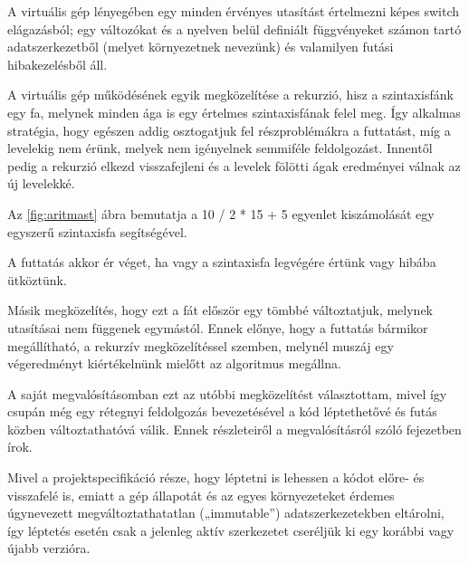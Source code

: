 A virtuális gép lényegében egy minden érvényes utasítást értelmezni képes switch elágazásból; egy változókat és a nyelven belül definiált függvényeket számon tartó adatszerkezetből (melyet környezetnek nevezünk) és valamilyen futási hibakezelésből áll.

A virtuális gép működésének egyik megközelítése a rekurzió, hisz a szintaxisfánk egy fa, melynek minden ága is egy értelmes szintaxisfának felel meg. Így alkalmas stratégia, hogy egészen addig osztogatjuk fel részproblémákra a futtatást, míg a levelekig nem érünk, melyek nem igényelnek semmiféle feldolgozást. Innentől pedig a rekurzió elkezd visszafejleni és a levelek fölötti ágak eredményei válnak az új levelekké.

Az \ref{fig:aritmast} ábra bemutatja a 10 / 2 * 15 + 5 egyenlet kiszámolását egy egyszerű szintaxisfa segítségével.


A futtatás akkor ér véget, ha vagy a szintaxisfa legvégére értünk vagy hibába ütköztünk. 

Másik megközelítés, hogy ezt a fát először egy tömbbé változtatjuk, melynek utasításai nem függenek egymástól. Ennek előnye, hogy a futtatás bármikor megállítható, a rekurzív megközelítéssel szemben, melynél muszáj egy végeredményt kiértékelnünk mielőtt az algoritmus megállna. 

A saját megvalósításomban ezt az utóbbi megközelítést választottam, mivel így csupán még egy rétegnyi feldolgozás bevezetésével a kód léptethetővé és futás közben változtathatóvá válik. Ennek részleteiről a megvalósításról szóló fejezetben írok.

Mivel a projektspecifikáció része, hogy léptetni is lehessen a kódot előre- és visszafelé is, emiatt a gép állapotát és az egyes környezeteket érdemes úgynevezett megváltoztathatatlan („immutable”) adatszerkezetekben eltárolni, így léptetés esetén csak a jelenleg aktív szerkezetet cseréljük ki egy korábbi vagy újabb verzióra.